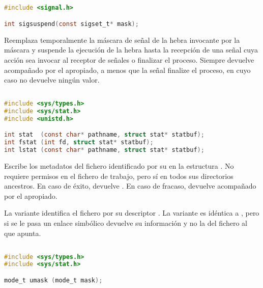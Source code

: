 \subsection{}\label{sigsuspend}

\begin{lstlisting}[language=C]
#include <signal.h>

int sigsuspend(const sigset_t* mask);
\end{lstlisting}

Reemplaza temporalmente la máscara de señal de la hebra invocante por la máscara  y suspende la ejecución de la hebra hasta la recepción de una señal cuya acción sea invocar al receptor de señales o finalizar el proceso.
Siempre devuelve  acompañado por el  apropiado, a menos que la señal finalize el proceso, en cuyo caso no devuelve ningún valor.

\subsection{}\label{stat}

\begin{lstlisting}[language=C]
#include <sys/types.h>
#include <sys/stat.h>
#include <unistd.h>

int stat  (const char* pathname, struct stat* statbuf);
int fstat (int fd, struct stat* statbuf);
int lstat (const char* pathname, struct stat* statbuf);
\end{lstlisting}

Escribe los metadatos del fichero identificado por su  en la estructura .
No requiere permisos en el fichero de trabajo, pero sí en todos sus directorios ancestros.
En caso de éxito, devuelve .
En caso de fracaso, devuelve  acompañado por el  apropiado.

La variante  identifica el fichero por su descriptor .
La variante  es idéntica a , pero si se le pasa un enlace simbólico devuelve su información y no la del fichero al que apunta.

\subsection{}\label{umask}

\begin{lstlisting}[language=C]
#include <sys/types.h>
#include <sys/stat.h>

mode_t umask (mode_t mask);
\end{lstlisting}


